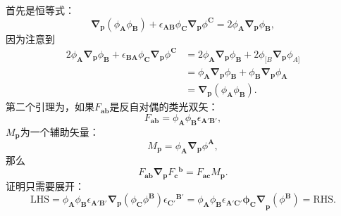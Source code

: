 首先是恒等式：
\begin{equation}
	\boldsymbol{\nabla }_{\boldsymbol{p}} (\phi _{\boldsymbol{A}} \phi _{\boldsymbol{B}} )+\epsilon _{\boldsymbol{AB}} \phi _{\boldsymbol{C}}\boldsymbol{\nabla }_{\boldsymbol{p}} \phi ^{\boldsymbol{C}} =2\phi _{\boldsymbol{A}}\boldsymbol{\nabla }_{\boldsymbol{p}} \phi _{\boldsymbol{B}} ,
	\label{eq:5.31}
\end{equation}
因为注意到
\begin{equation*}
	\begin{aligned}
		2\phi _{\boldsymbol{A}}\mathbf{\nabla }_{\boldsymbol{p}} \phi _{\boldsymbol{B}} +\epsilon _{\boldsymbol{BA}} \phi _{\boldsymbol{C}}\mathbf{\nabla }_{\boldsymbol{p}} \phi ^{\boldsymbol{C}} & =2\phi _{\boldsymbol{A}}\mathbf{\nabla }_{\boldsymbol{p}} \phi _{\boldsymbol{B}} +2\phi _{[ B}\mathbf{\nabla }_{\boldsymbol{p}} \phi _{A]}\\
		& =\phi _{\boldsymbol{A}}\mathbf{\nabla }_{\boldsymbol{p}} \phi _{\boldsymbol{B}} +\phi _{\boldsymbol{B}}\mathbf{\nabla }_{\boldsymbol{p}} \phi _{\boldsymbol{A}}\\
		& =\mathbf{\nabla }_{\boldsymbol{p}} (\phi _{\boldsymbol{A}} \phi _{\boldsymbol{B}} ).
	\end{aligned}
\end{equation*}
第二个引理为，如果$F_{\boldsymbol{ab}}$是反自对偶的类光双矢：
\begin{equation*}
	F_{\boldsymbol{ab}} =\phi _{\boldsymbol{A}} \phi _{\boldsymbol{B}} \epsilon _{\boldsymbol{A} '\boldsymbol{B} '} ,
\end{equation*}
$M_{\boldsymbol{p}}$为一个辅助矢量：
\begin{equation*}
	M_{\boldsymbol{p}} =\phi _{\boldsymbol{A}}\boldsymbol{\nabla }_{\boldsymbol{p}} \phi ^{\boldsymbol{A}} ,
\end{equation*}
那么
\begin{equation}
	F_{\boldsymbol{ab}}\boldsymbol{\nabla }_{\boldsymbol{p}} F{_{\boldsymbol{c}}}^{\boldsymbol{b}} =F_{\boldsymbol{ac}} M_{\boldsymbol{p}} .
	\label{eq:5.32}
\end{equation}
证明只需要展开：
\begin{equation*}
	\mathrm{LHS} =\phi _{\boldsymbol{A}} \phi _{\boldsymbol{B}} \epsilon _{\boldsymbol{A} '\boldsymbol{B} '}\boldsymbol{\nabla }_{\boldsymbol{p}} (\phi _{\boldsymbol{C}} \phi ^{\boldsymbol{B}} )\epsilon {_{\boldsymbol{C} '}}^{\boldsymbol{B} '} =\phi _{\boldsymbol{A}} \phi _{\boldsymbol{B}} \epsilon _{\boldsymbol{A} '\boldsymbol{C} '}\boldsymbol{\phi _{\boldsymbol{C}} \nabla }_{\boldsymbol{p}} (\phi ^{\boldsymbol{B}} )=\mathrm{RHS} .
\end{equation*}


